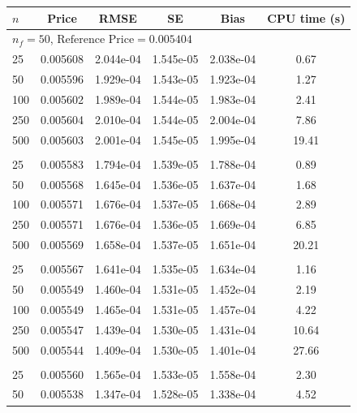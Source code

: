 \documentclass[11pt]{article}%
\theoremstyle{definition}
\begin{document}
\begin{table}[tph]
  \begin{center}
  \begin{tabular}{lccccc}
    \hline\hline
    $n$ & Price & RMSE & SE & Bias & CPU time (s) \\
    \hline
    \multicolumn{6}{l}{$n_f = 50$, $\text{Reference Price} = 0.005404$} \\
      25 & 0.005608 & 2.044e-04 & 1.545e-05 & 2.038e-04 & 0.67 \\
      50 & 0.005596 & 1.929e-04 & 1.543e-05 & 1.923e-04 & 1.27 \\
     100 & 0.005602 & 1.989e-04 & 1.544e-05 & 1.983e-04 & 2.41 \\
     250 & 0.005604 & 2.010e-04 & 1.544e-05 & 2.004e-04 & 7.86 \\
     500 & 0.005603 & 2.001e-04 & 1.545e-05 & 1.995e-04 & 19.41 \\
    \addlinespace
    \multicolumn{6}{l}{$n_f = 100$, $\text{Reference Price} = 0.005404$} \\
      25 & 0.005583 & 1.794e-04 & 1.539e-05 & 1.788e-04 & 0.89 \\
      50 & 0.005568 & 1.645e-04 & 1.536e-05 & 1.637e-04 & 1.68 \\
     100 & 0.005571 & 1.676e-04 & 1.537e-05 & 1.668e-04 & 2.89 \\
     250 & 0.005571 & 1.676e-04 & 1.536e-05 & 1.669e-04 & 6.85 \\
     500 & 0.005569 & 1.658e-04 & 1.537e-05 & 1.651e-04 & 20.21 \\
    \addlinespace
    \multicolumn{6}{l}{$n_f = 200$, $\text{Reference Price} = 0.005404$} \\
      25 & 0.005567 & 1.641e-04 & 1.535e-05 & 1.634e-04 & 1.16 \\
      50 & 0.005549 & 1.460e-04 & 1.531e-05 & 1.452e-04 & 2.19 \\
     100 & 0.005549 & 1.465e-04 & 1.531e-05 & 1.457e-04 & 4.22 \\
     250 & 0.005547 & 1.439e-04 & 1.530e-05 & 1.431e-04 & 10.64 \\
     500 & 0.005544 & 1.409e-04 & 1.530e-05 & 1.401e-04 & 27.66 \\
    \addlinespace
    \multicolumn{6}{l}{$n_f = 400$, $\text{Reference Price} = 0.005404$} \\
      25 & 0.005560 & 1.565e-04 & 1.533e-05 & 1.558e-04 & 2.30 \\
      50 & 0.005538 & 1.347e-04 & 1.528e-05 & 1.338e-04 & 4.52 \\

\end{tabular}
\end{center}
\end{table}
\end{document}
